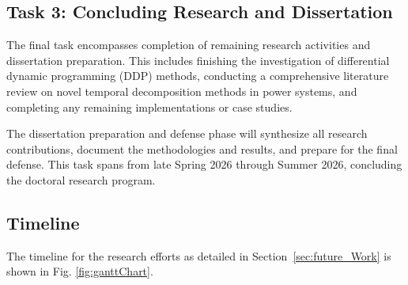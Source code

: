 \subsection{Task 3: Concluding Research and Dissertation}
The final task encompasses completion of remaining research activities and dissertation preparation. This includes finishing the investigation of differential dynamic programming (DDP) methods, conducting a comprehensive literature review on novel temporal decomposition methods in power systems, and completing any remaining implementations or case studies.

The dissertation preparation and defense phase will synthesize all research contributions, document the methodologies and results, and prepare for the final defense. This task spans from late Spring 2026 through Summer 2026, concluding the doctoral research program.    

\clearpage
\subsection{Timeline}
The timeline for the research efforts as detailed in Section~\ref{sec:future_Work} is shown in Fig. \ref{fig:ganttChart}.

